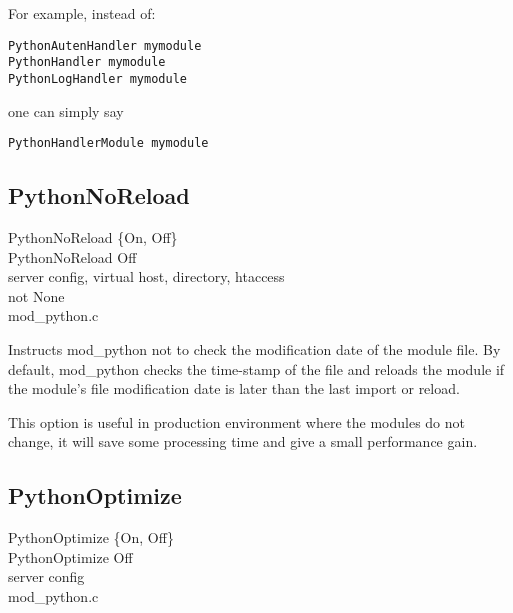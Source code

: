 For example, instead of:
\begin{verbatim}
PythonAutenHandler mymodule
PythonHandler mymodule
PythonLogHandler mymodule
\end{verbatim}    

one can simply say
\begin{verbatim}
PythonHandlerModule mymodule
\end{verbatim}    

\subsection{PythonNoReload\label{dir-other-pnr}}

PythonNoReload \{On, Off\} \\
PythonNoReload Off\\
server config, virtual host, directory, htaccess\\
not None\\
mod_python.c

Instructs mod_python not to check the modification date of the module
file. By default, mod_python checks the time-stamp of the file and
reloads the module if the module's file modification date is later
than the last import or reload.

This option is useful in production environment where the modules do
not change, it will save some processing time and give a small
performance gain.

\subsection{PythonOptimize\label{dir-other-pomz}}

PythonOptimize \{On, Off\} \\
PythonOptimize Off\\
server config\\
mod_python.c

